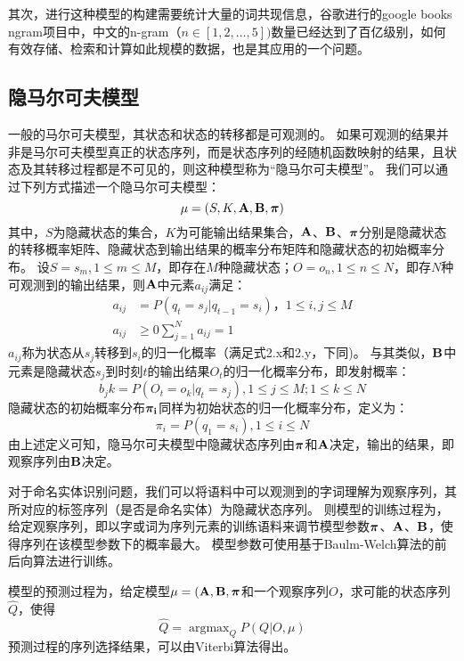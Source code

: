 其次，进行这种模型的构建需要统计大量的词共现信息，谷歌进行的google books ngram项目中，中文的n-gram（$n\in[1, 2, \dots, 5])$数量已经达到了百亿级别，如何有效存储、检索和计算如此规模的数据，也是其应用的一个问题。
\subsection{隐马尔可夫模型}
一般的马尔可夫模型，其状态和状态的转移都是可观测的。
如果可观测的结果并非是马尔可夫模型真正的状态序列，而是状态序列的经随机函数映射的结果，且状态及其转移过程都是不可见的，则这种模型称为“隐马尔可夫模型”。
我们可以通过下列方式描述一个隐马尔可夫模型：
\begin{equation}
    \mu =(S, K, \boldsymbol{\mathbf{A}}, \boldsymbol{\mathbf{B}}, \boldsymbol{\mathbf{\pi}})
\end{equation}
其中，$S$为隐藏状态的集合，$K$为可能输出结果集合，$\boldsymbol{\mathbf{A}}$、$\boldsymbol{\mathbf{B}}$、$\boldsymbol{\mathbf{\pi}}$分别是隐藏状态的转移概率矩阵、隐藏状态到输出结果的概率分布矩阵和隐藏状态的初始概率分布。
设$S={s_m}, 1\leq m \leq M$，即存在$M$种隐藏状态；$O={o_n}, 1\leq n\leq N$，即存$N$种可观测到的输出结果，则$\boldsymbol{\mathbf{A}}$中元素$a_{ij}$满足：
\begin{align}
    a_{ij} &= P(q_t = s_j|q_{t-1} = s_i)， 1\leq i,j \leq M\\
    a_{ij} &\geq 0
    \sum^{N}_{j=1}a_{ij} = 1
\end{align}
$a_{ij}$称为状态从$s_j$转移到$s_i$的归一化概率（满足式2.x和2.y，下同)。
与其类似，$\boldsymbol{\mathbf{B}}$中元素是隐藏状态$s_j$到时刻$t$的输出结果$O_t$的归一化概率分布，即发射概率：
\begin{equation}
    b_j{k} = P(O_t = o_k |q_t = s_j), 1\leq j \leq M; 1\leq k\leq N
\end{equation}
隐藏状态的初始概率分布$\boldsymbol{\mathbf{\pi_i}}$同样为初始状态的归一化概率分布，定义为：
\begin{equation}
    \pi_i = P(q_1 = s_i), 1\leq i \leq N
\end{equation}
由上述定义可知，隐马尔可夫模型中隐藏状态序列由$\boldsymbol{\mathbf{\pi}}$和$\boldsymbol{\mathbf{A}}$决定，输出的结果，即观察序列由$\boldsymbol{\mathbf{B}}$决定。

对于命名实体识别问题，我们可以将语料中可以观测到的字词理解为观察序列，其所对应的标签序列（是否是命名实体）为隐藏状态序列。
则模型的训练过程为，给定观察序列，即以字或词为序列元素的训练语料来调节模型参数$\boldsymbol{\mathbf{\pi}}$、$\boldsymbol{\mathbf{A}}$、$\boldsymbol{\mathbf{B}}$，使得序列在该模型参数下的概率最大。
模型参数可使用基于Baulm-Welch算法的前后向算法进行训练。

模型的预测过程为，给定模型$\mu = (\boldsymbol{\mathbf{A}},\boldsymbol{\mathbf{B}},\boldsymbol{\mathbf{\pi}}$和一个观察序列$O$，求可能的状态序列$\hat{Q}$，使得
\begin{equation}
    \hat{Q} = \mathop{\arg \max}_Q P(Q|O,\mu)
\end{equation}
预测过程的序列选择结果，可以由Viterbi算法得出。

